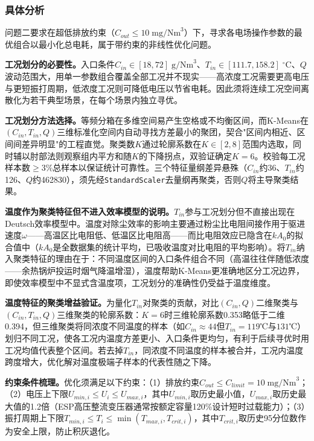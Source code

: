 
\subsubsection{具体分析}

问题二要求在超低排放约束（$C_{out}\leq 10\;\text{mg/Nm}^3$）下，寻求各电场操作参数的最优组合以最小化总电耗，属于带约束的非线性优化问题。

\textbf{工况划分的必要性。}入口条件$C_{in}\in[18,72]\;\text{g/Nm}^3$、$T_{in}\in[111.7,158.2]\;^\circ\text{C}$、$Q$波动范围大，用单一参数组合覆盖全部工况并不现实——高浓度工况需要更高电压与更短振打周期，低浓度工况则可降低电压以节省电耗。因此须将连续工况空间离散化为若干典型场景，在每个场景内独立寻优。

\textbf{工况划分方法选择。}等频分箱在多维空间易产生空格或不均衡区间，而K-Means在$(C_{in},T_{in},Q)$三维标准化空间内自动寻找方差最小的聚团，契合"区间内相近、区间间差异明显"的工程直觉。聚类数$K$通过轮廓系数在$K\in[2,8]$范围内选取，同时辅以肘部法则观察组内平方和随$K$的下降拐点，双验证确定$K=6$。校验每工况样本数$\geq 3\%$总样本以保证统计可靠性。三个特征量纲差异悬殊（$C_{in}$约36、$T_{in}$约126、$Q$约462830），须先经\texttt{StandardScaler}去量纲再聚类，否则$Q$将主导聚类结果。

\textbf{温度作为聚类特征但不进入效率模型的说明。}$T_{in}$参与工况划分但不直接出现在Deutsch效率模型中。温度对除尘效率的影响主要通过粉尘比电阻间接作用于驱进速度$\omega$——高温区比电阻低、低温区比电阻高——而比电阻效应已隐含在$kA_0$的拟合值中（$kA_0$是全数据集的统计平均，已吸收温度对比电阻的平均影响）。将$T_{in}$纳入聚类特征的理由在于：不同温度区间的入口条件组合不同（高温往往伴随低浓度——余热锅炉投运时烟气降温增湿），温度帮助K-Means更准确地区分工况边界，即使效率模型中不显式含温度项，工况划分的准确性仍受益于温度维度。

\textbf{温度特征的聚类增益验证。}为量化$T_{in}$对聚类的贡献，对比$(C_{in},Q)$二维聚类与$(C_{in},T_{in},Q)$三维聚类的轮廓系数：$K=6$时三维轮廓系数0.353略低于二维0.394，但三维聚类将同浓度不同温度的样本（如$C_{in}\approx44$但$T_{in}=119$℃与$131$℃）划归不同工况，使各工况内温度方差更小、入口条件更均匀，有利于后续寻优时用工况均值代表整个区间。若去掉$T_{in}$，同浓度不同温度的样本被合并，工况内温度跨度增大，优化解对温度极端子样本的代表性随之下降。

\textbf{约束条件梳理。}优化须满足以下约束：（1）排放约束$C_{out}\leq C_{limit}=10\;\text{mg/Nm}^3$；（2）电压上下限$U_{min,i}\leq U_i\leq U_{max,i}$，其中$U_{min,i}$取历史最小值，$U_{max,i}$取历史最大值的1.2倍（ESP高压整流变压器通常按额定容量120\%设计短时过载能力）；（3）振打周期上下限$T_{min,i}\leq T_i\leq\min(T_{max,i},T_{crit,i})$，其中$T_{crit,i}$取历史95分位数作为安全上限，防止积灰退化。

